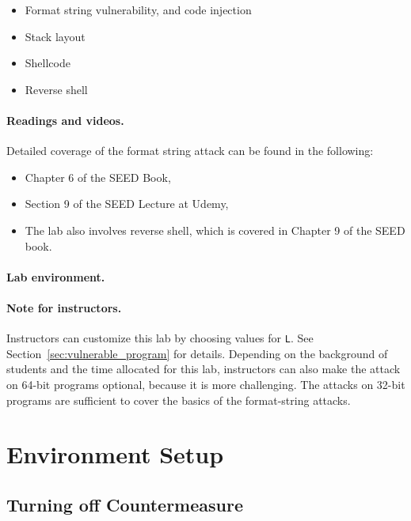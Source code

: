 \begin{itemize}[noitemsep]
\item Format string vulnerability, and code injection
\item Stack layout
\item Shellcode 
\item Reverse shell 
\end{itemize}


\paragraph{Readings and videos.}
Detailed coverage of the format string attack can be found in the following:

\begin{itemize}
\item Chapter 6 of the SEED Book, \seedbook
\item Section 9 of the SEED Lecture at Udemy, \seedcsvideo
\item The lab also involves reverse shell, which is covered in Chapter 9 of the SEED book.
\end{itemize}


\paragraph{Lab environment.} \seedenvironmentC

\paragraph{Note for instructors.}
Instructors can customize this lab by choosing values
for \texttt{L}. See Section~\ref{sec:vulnerable_program} for details.
Depending on the background of students and the time allocated
for this lab, instructors can also make the
attack on 64-bit programs optional, because it is 
more challenging. The attacks on 32-bit programs are sufficient
to cover the basics of the format-string attacks.

\section{Environment Setup} 


\subsection{Turning off Countermeasure} 

